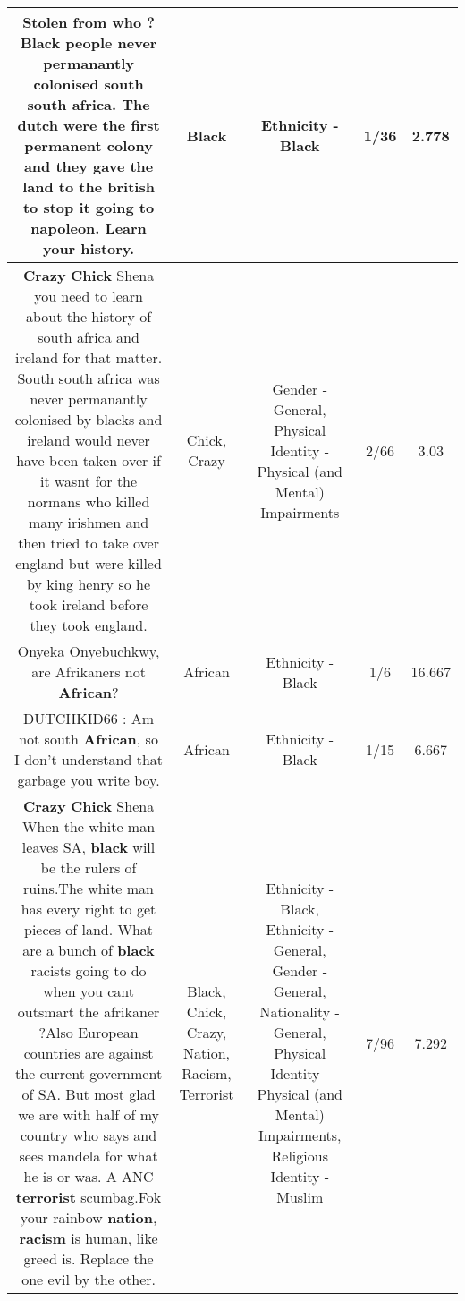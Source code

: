 \documentclass[11pt]{article}
\newlength\mylength
\begin{document}
\begin{center}
\begin{longtable}{|C{.65\mylength}|C{.30\mylength}|C{.12\mylength}|C{.12\mylength}|C{.12\mylength}|}
  \small Stolen from who ? \textbf{Black} people never permanantly colonised south south africa. The dutch were the first permanent colony and they gave the land to the british to stop it going to napoleon. Learn your history.\normalsize   & Black & Ethnicity - Black & 1/36 & 2.778 \\  \hline
  \small \@\textbf{Crazy} \textbf{Chick} Shena you need to learn about the history of south africa and ireland for that matter. South south africa was never permanantly colonised by blacks and ireland would never have been taken over if it wasnt for the normans who killed many irishmen and then tried to take over england but were killed by king henry so he took ireland before they took england.\normalsize   & Chick, Crazy & Gender - General, Physical Identity - Physical (and Mental) Impairments & 2/66 & 3.03 \\  \hline
  \small Onyeka Onyebuchkwy, are Afrikaners not \textbf{African}?\normalsize   & African & Ethnicity - Black & 1/6 & 16.667 \\  \hline
  \small DUTCHKID66 : Am not south \textbf{African}, so I don't understand that garbage you write boy.\normalsize   & African & Ethnicity - Black & 1/15 & 6.667 \\  \hline
  \small \@\textbf{Crazy} \textbf{Chick} Shena When the white man leaves SA, \textbf{black} will be the rulers of ruins.The white man has every right to get pieces of land. What are a bunch of \textbf{black} racists going to do when you cant outsmart the afrikaner ?Also European countries are against the current government of SA. But most glad we are with half of my country who says and sees mandela for what he is or was. A ANC \textbf{terrorist} scumbag.Fok your rainbow \textbf{nation}, \textbf{racism} is human, like greed is. Replace the one evil by the other.\normalsize   & Black, Chick, Crazy, Nation, Racism, Terrorist & Ethnicity - Black, Ethnicity - General, Gender - General, Nationality - General, Physical Identity - Physical (and Mental) Impairments, Religious Identity - Muslim & 7/96 & 7.292 \\  \hline

\end{longtable}
\end{center}
\end{document}
